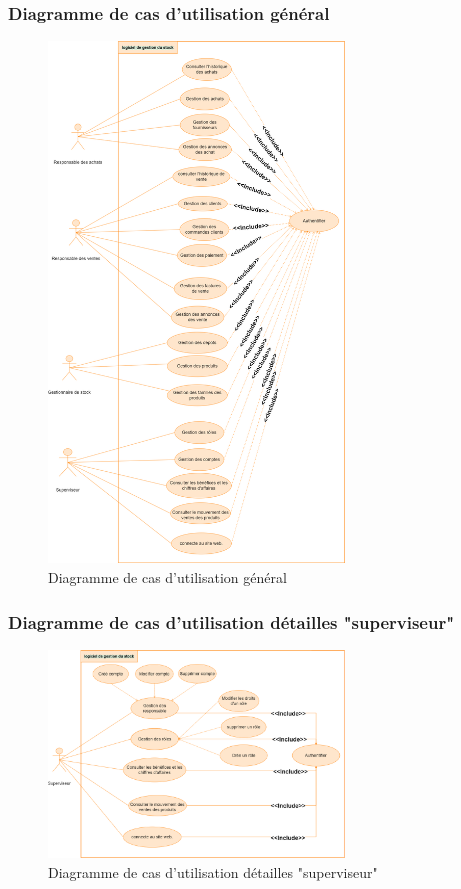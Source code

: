 \documentclass[edit,12pt,a4paper,ChapStyle,oneside,doubleinterligne]{report}
\begin{document}
\subsubsection{Diagramme de cas d'utilisation général}
\begin{figure}[h!]\label{fig:Diagramme de cas d'utilisation}
\centering
\includegraphics[width=0.7\textwidth]{images/diagramee L G.png}
\caption{Diagramme de cas d'utilisation général}
\end{figure}
\newpage
\subsubsection{Diagramme de cas d'utilisation détailles "superviseur" }
\begin{figure}[h!]\label{fig:diagramme de cas d'utilisation détailles "Superviseur"}
\centering
\includegraphics[width=0.7\textwidth]{images/usecase SU.png}
\caption{Diagramme de cas d'utilisation détailles "superviseur"}
\end{figure}
\end{document}
